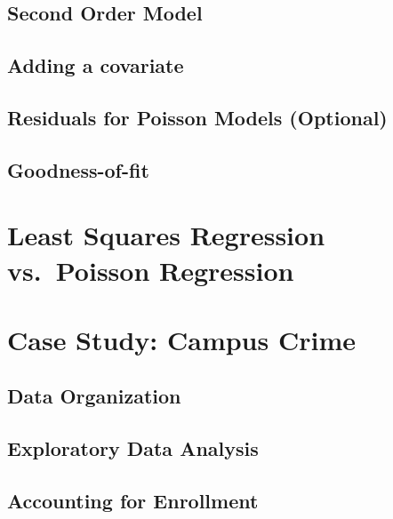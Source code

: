 \documentclass[
]{krantz}
\begin{document}
\hypertarget{second-order-model}{%
\subsection{Second Order Model}\label{second-order-model}}

\hypertarget{adding-a-covariate}{%
\subsection{Adding a covariate}\label{adding-a-covariate}}

\hypertarget{sec-PoisResid}{%
\subsection{Residuals for Poisson Models (Optional)}\label{sec-PoisResid}}

\hypertarget{sec-PoisGOF}{%
\subsection{Goodness-of-fit}\label{sec-PoisGOF}}

\hypertarget{least-squares-regression-vs.-poisson-regression}{%
\section{Least Squares Regression vs.~Poisson Regression}\label{least-squares-regression-vs.-poisson-regression}}

\hypertarget{case-study-campus-crime}{%
\section{Case Study: Campus Crime}\label{case-study-campus-crime}}

\hypertarget{data-organization-1}{%
\subsection{Data Organization}\label{data-organization-1}}

\hypertarget{exploratory-data-analysis}{%
\subsection{Exploratory Data Analysis}\label{exploratory-data-analysis}}

\hypertarget{accounting-for-enrollment}{%
\subsection{Accounting for Enrollment}\label{accounting-for-enrollment}}
\end{document}
